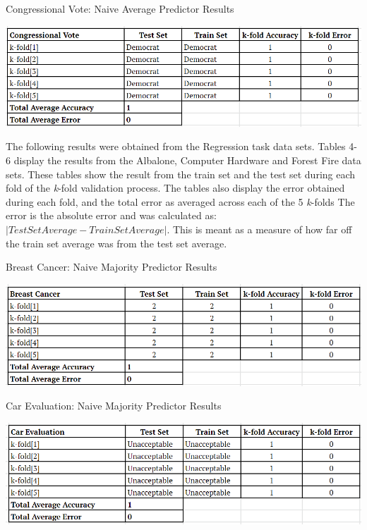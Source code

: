 \documentclass[twoside,11pt]{article}
\begin{document}
\begin{table}[h!]
	\begin{center}
		\caption{Congressional Vote: Naive Average Predictor Results}
		\label{tab:table6}
		\includegraphics[scale=.6]{CV_Results}\newline
	\end{center}
\end{table}
\newpage

The following results were obtained from the Regression task data sets. Tables 4-6 display the results from the Albalone, Computer Hardware and Forest Fire data sets. These tables show the result from the train set and the test set during each fold of the \textit{k}-fold validation process.  The tables also display the error obtained during each fold, and the total error as averaged across each of the 5 \textit{k}-folds The error is the absolute error and was calculated as: $| Test Set Average - Train Set Average|$. This is meant as a measure of how far off the train set average was from the test set average. 

\begin{table}[h!]
	\begin{center}
		\caption{Breast Cancer: Naive Majority Predictor Results}
		\label{tab:table1}
		\includegraphics[scale=.6]{BC_Results}\newline
	\end{center}
\end{table}

\begin{table}[h!]
	\begin{center}
		\caption{Car Evaluation: Naive Majority Predictor Results}
		\label{tab:table2}
		\includegraphics[scale=.6]{CE_Results}\newline
	\end{center}
\end{table}
\end{document}
